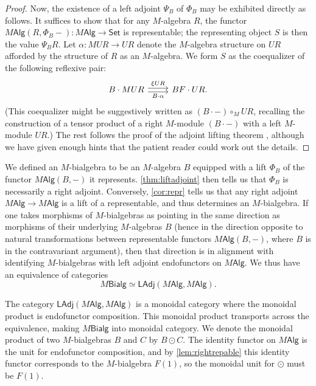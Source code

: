 \documentclass[12pt,reqno]{amsart}
\theoremstyle{plain}
\theoremstyle{definition}
\theoremstyle{remark}
\newcommand{\maps}{\colon}
\newcommand{\namedcat}[1]{\mathsf{#1}}
\newcommand{\Alg}{\namedcat{Alg}}
\newcommand{\Bialg}{\namedcat{Bialg}}
\newcommand{\LAdj}{\namedcat{LAdj}}
\newcommand{\Set}{\namedcat{Set}}
\numberwithin{thm}{section}
\begin{document}
\begin{proof}
    Now, the existence of a left adjoint $\Psi_B$ of $\Phi_B$ may be exhibited directly as follows. It suffices to show that for any $M$-algebra $R$, the functor $M\Alg(R, \Phi_B-) \maps M\Alg \to \Set$ is representable; the representing object $S$ is then the value $\Psi_B R$. Let $\alpha \maps M UR \to UR$ denote the $M$-algebra structure on $UR$ afforded by the structure of $R$ as an $M$-algebra. We form $S$ as the coequalizer of the following reflexive pair:
    \[
    \begin{tikzcd}
        B \cdot MUR  
        \arrow[r, rightarrow, shift left=0.5ex, "\xi UR"] 
        \arrow[r, rightarrow, shift right=0.5ex, swap, "B \cdot \alpha"] 
        & 
        BF \cdot UR.
    \end{tikzcd}
    \]
    (This coequalizer might be suggestively written as $(B \cdot -) \circ_M UR$, recalling the construction of a tensor product of a right $M$-module $(B \cdot -)$ with a left $M$-module $UR$.) The rest follows the proof of the adjoint lifting theorem \cite[Theorem 4.5.6 and Exercise 4.8.6]{BorceuxII}, although we have given enough hints that the patient reader could work out the details.
\end{proof}

We defined an $M$-bialgebra to be an $M$-algebra $B$ equipped with a lift $\Phi_B$ of the functor $M\Alg(B,-)$ it represents. \cref{thm:liftadjoint} then tells us that $\Phi_B$ is necessarily a right adjoint. Conversely, \cref{cor:repr} tells us that any right adjoint $M\Alg \to M\Alg$ is a lift of a representable, and thus determines an $M$-bialgebra. If one takes morphisms of $M$-bialgebras as pointing in the same direction as morphisms of their underlying $M$-algebras $B$ (hence in the direction opposite to natural transformations between representable functors $M\Alg(B, -)$, where $B$ is in the contravariant argument), then that direction is in alignment with identifying $M$-bialgebras with left adjoint endofunctors on $M\Alg$. We thus have an equivalence of categories
\[
    M\Bialg \simeq \LAdj(M\Alg, M\Alg).
\] 

The category $\LAdj(M\Alg, M\Alg)$ is a monoidal category where the monoidal product is endofunctor composition. This monoidal product transports across the equivalence, making $M\Bialg$ into monoidal category. We denote the monoidal product of two $M$-bialgebras $B$ and $C$ by $B \odot C$. The identity functor on $M\Alg$ is the unit for endofunctor composition, and by \cref{lem:rightrepable} this identity functor corresponds to the $M$-bialgebra $F(1)$, so the monoidal unit for $\odot$ must be $F(1)$. 
\end{document}
